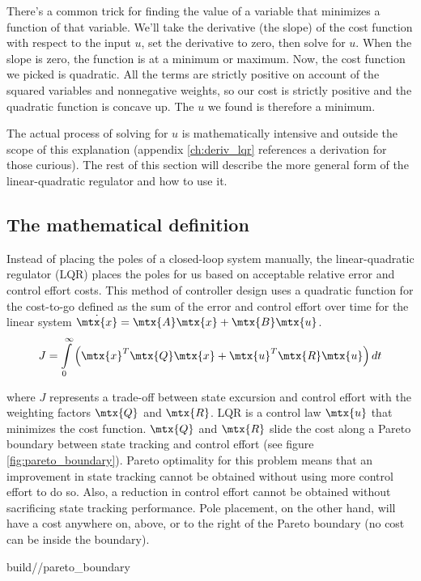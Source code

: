 There's a common trick for finding the value of a variable that minimizes a
function of that variable. We'll take the derivative (the slope) of the cost
function with respect to the input $u$, set the derivative to zero, then solve
for $u$. When the slope is zero, the function is at a minimum or maximum. Now,
the cost function we picked is quadratic. All the terms are strictly positive on
account of the squared variables and nonnegative weights, so our cost is
strictly positive and the quadratic function is concave up. The $u$ we found is
therefore a minimum.

The actual process of solving for $u$ is mathematically intensive and outside
the scope of this explanation (appendix \ref{ch:deriv_lqr} references a
derivation for those curious). The rest of this section will describe the more
general form of the linear-quadratic regulator and how to use it.

\subsection{The mathematical definition}

Instead of placing the poles of a closed-loop \gls{system} manually, the
linear-quadratic regulator (LQR) places the poles for us based on acceptable
relative \gls{error} and \gls{control effort} costs. This method of controller
design uses a quadratic function for the cost-to-go defined as the sum of the
\gls{error} and \gls{control effort} over time for the linear \gls{system}
$\dot{\mtx{x}} = \mtx{A}\mtx{x} + \mtx{B}\mtx{u}$.
\begin{equation*}
  J = \int\limits_0^\infty \left(\mtx{x}^T\mtx{Q}\mtx{x} +
    \mtx{u}^T\mtx{R}\mtx{u}\right) dt
\end{equation*}

where $J$ represents a trade-off between \gls{state} excursion and
\gls{control effort} with the weighting factors $\mtx{Q}$ and $\mtx{R}$. LQR is
a \gls{control law} $\mtx{u}$ that minimizes the cost function. $\mtx{Q}$ and
$\mtx{R}$ slide the cost along a Pareto boundary between state tracking and
\gls{control effort} (see figure \ref{fig:pareto_boundary}). Pareto optimality
for this problem means that an improvement in state \gls{tracking} cannot be
obtained without using more \gls{control effort} to do so. Also, a reduction in
\gls{control effort} cannot be obtained without sacrificing state \gls{tracking}
performance. Pole placement, on the other hand, will have a cost anywhere on,
above, or to the right of the Pareto boundary (no cost can be inside the
boundary).
\begin{svg}{build/\chapterpath/pareto_boundary}
  \caption{Pareto boundary for LQR}
  \label{fig:pareto_boundary}
\end{svg}

